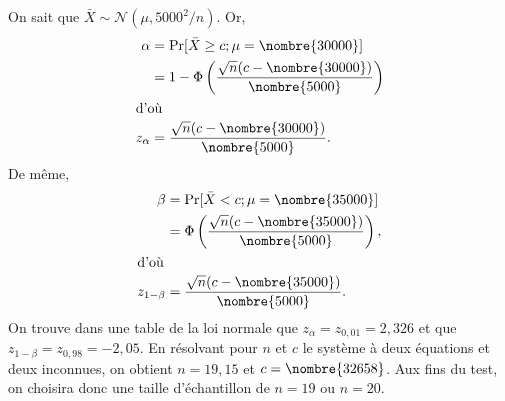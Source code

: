 \begin{solution}{6.4}
    On sait que $\bar{X} \sim \mathcal{N}(\mu, 5000^2/n)$. Or,
    \begin{align*}
      \alpha &= \prob{\bar{X} \geq c; \mu = \nombre{30 000}} \\
      &= 1 -
      \Phi\left(
        \frac{\sqrt{n}(c - \nombre{30000})}{\nombre{5000}}
      \right) \\
      \intertext{d'où}
      z_\alpha &=
      \frac{\sqrt{n}(c-\nombre{30000})}{\nombre{5000}}.
    \end{align*}
    De même,
    \begin{align*}
      \beta &= \prob{\bar{X} < c; \mu = \nombre{35000}}\\
      &= \Phi\left(
        \frac{\sqrt{n}(c - \nombre{35000})}{\nombre{5000}}
      \right), \\
      \intertext{d'où}
      z_{1 - \beta} &=
      \frac{\sqrt{n}(c-\nombre{35000})}{\nombre{5000}}.
    \end{align*}
    On trouve dans une table de la loi normale que $z_\alpha =
    z_{0,01} = 2,326$ et que $z_{1 - \beta} = z_{0,98} = -2,05$. En
    résolvant pour $n$ et $c$ le système à deux équations et deux
    inconnues, on obtient $n = 19,15$ et $c = \nombre{32658}$. Aux
    fins du test, on choisira donc une taille d'échantillon de $n =
    19$ ou $n = 20$.
  
\end{solution}
